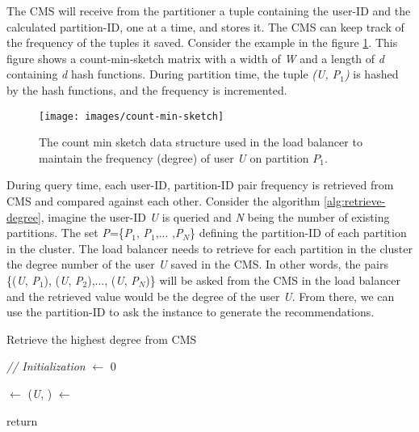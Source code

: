 The CMS will receive from the partitioner a tuple containing the user-ID and the calculated partition-ID, one at a time, and stores it. The CMS can keep track of the frequency of the tuples it saved. Consider the example in the figure \ref{fig:count-min-sketch}. This figure shows a count-min-sketch matrix with a width of \emph{W} and a length of \emph{d} containing \emph{d} hash functions. During partition time, the tuple \emph{(\emph{U}, \emph{P$_1$})} is hashed by the hash functions, and the frequency is incremented.

\begin{figure}[!htb]
    \centering
    \texttt{[image: images/count-min-sketch]}
    \caption{The count min sketch data structure used in the load balancer to maintain the frequency (degree) of user \emph{U} on partition \emph{$P_1$}.}
    \label{fig:count-min-sketch}
\end{figure}


During query time, each user-ID, partition-ID pair frequency is retrieved from CMS and compared against each other. Consider the algorithm \ref{alg:retrieve-degree}, imagine the user-ID \emph{U} is queried and \emph{N} being the number of existing partitions. The set \emph{P}=\{\emph{P$_1$}, \emph{P$_1$},... ,\emph{P$_N$}\} defining the partition-ID of each partition in the cluster. The load balancer needs to retrieve for each partition in the cluster the degree number of the user \emph{U} saved in the CMS. In other words, the pairs \{(\emph{U}, \emph{P$_1$}), (\emph{U}, \emph{P$_2$}),..., (\emph{U}, \emph{P$_N$})\} will be asked from the CMS in the load balancer and the retrieved value would be the degree of the user \emph{U}. From there, we can use the partition-ID to ask the instance to generate the recommendations.


\begin{algorithm}[!htb]
    \caption{Retrieve the highest degree from CMS}
    \label{alg:retrieve-degree}




    \SetAlgoLined

    \BlankLine\emph{// Initialization}\BlankLine
    \degree $\leftarrow$ 0 \;

    \BlankLine
    {
        \tuple $\leftarrow$ (\emph{U}, \partitionId)\;
        \count $\leftarrow$ \;
        \If{ \count $>$ \degree}{
                \degree $\leftarrow$ \count \;
                \partitionToAsk $\leftarrow$ $\partitionId$ \;
            }
    }

    return \partitionToAsk \;

    \BlankLine
\end{algorithm}


